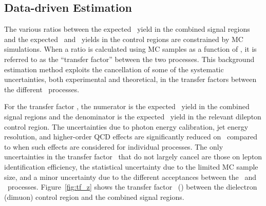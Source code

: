 \subsection{Data-driven Estimation}
\label{sec:transfer_factors}

The various ratios between the expected \zinvg\ yield in the combined signal regions and the expected \wlng\ and \zllg\ yields in the control regions are constrained by MC simulations.
When a ratio is calculated using MC samples as a function of \ETg, it is referred to as the ``transfer factor'' between the two processes.
This background estimation method exploits the cancellation of some of the systematic uncertainties, both experimental and theoretical, in the transfer factors between the different  \vg\ processes.
 
For the transfer factor \RZll, the numerator is the expected \zinvg\ yield in the combined signal regions and the denominator is the expected \zllg\ yield in the relevant dilepton control region.
The uncertainties due to photon energy calibration, jet energy resolution, and higher-order QCD effects are significantly reduced on \RZll\ compared to when such effects are considered for individual processes. 
The only uncertainties in the transfer factor \RZll\ that do not largely cancel are those on lepton identification efficiency, the statistical uncertainty due to the limited MC sample size, and a minor uncertainty due to the different acceptances between the \zinvg\ and \zllg\ processes.
Figure~\ref{fig:tf_z} shows the transfer factor \RZee\ (\RZmm) between the dielectron (dimuon) control region and the combined signal regions.


